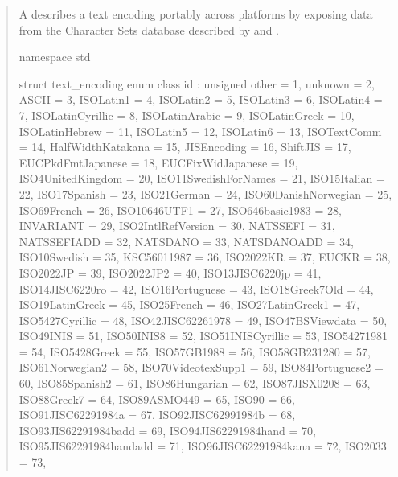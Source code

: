 \documentclass{wg21}
\begin{document}
\begin{quote}
\begin{addedblock}

A  describes a text encoding portably across platforms by exposing data from the Character Sets database described by \cite{rfc2978} and \cite{rfc3808}.

\begin{codeblock}

namespace std {

struct text_encoding{
    enum class id : unsigned {
        other = 1,
        unknown = 2,
        ASCII = 3,
        ISOLatin1 = 4,
        ISOLatin2 = 5,
        ISOLatin3 = 6,
        ISOLatin4 = 7,
        ISOLatinCyrillic = 8,
        ISOLatinArabic = 9,
        ISOLatinGreek = 10,
        ISOLatinHebrew = 11,
        ISOLatin5 = 12,
        ISOLatin6 = 13,
        ISOTextComm = 14,
        HalfWidthKatakana = 15,
        JISEncoding = 16,
        ShiftJIS = 17,
        EUCPkdFmtJapanese = 18,
        EUCFixWidJapanese = 19,
        ISO4UnitedKingdom = 20,
        ISO11SwedishForNames = 21,
        ISO15Italian = 22,
        ISO17Spanish = 23,
        ISO21German = 24,
        ISO60DanishNorwegian = 25,
        ISO69French = 26,
        ISO10646UTF1 = 27,
        ISO646basic1983 = 28,
        INVARIANT = 29,
        ISO2IntlRefVersion = 30,
        NATSSEFI = 31,
        NATSSEFIADD = 32,
        NATSDANO = 33,
        NATSDANOADD = 34,
        ISO10Swedish = 35,
        KSC56011987 = 36,
        ISO2022KR = 37,
        EUCKR = 38,
        ISO2022JP = 39,
        ISO2022JP2 = 40,
        ISO13JISC6220jp = 41,
        ISO14JISC6220ro = 42,
        ISO16Portuguese = 43,
        ISO18Greek7Old = 44,
        ISO19LatinGreek = 45,
        ISO25French = 46,
        ISO27LatinGreek1 = 47,
        ISO5427Cyrillic = 48,
        ISO42JISC62261978 = 49,
        ISO47BSViewdata = 50,
        ISO49INIS = 51,
        ISO50INIS8 = 52,
        ISO51INISCyrillic = 53,
        ISO54271981 = 54,
        ISO5428Greek = 55,
        ISO57GB1988 = 56,
        ISO58GB231280 = 57,
        ISO61Norwegian2 = 58,
        ISO70VideotexSupp1 = 59,
        ISO84Portuguese2 = 60,
        ISO85Spanish2 = 61,
        ISO86Hungarian = 62,
        ISO87JISX0208 = 63,
        ISO88Greek7 = 64,
        ISO89ASMO449 = 65,
        ISO90 = 66,
        ISO91JISC62291984a = 67,
        ISO92JISC62991984b = 68,
        ISO93JIS62291984badd = 69,
        ISO94JIS62291984hand = 70,
        ISO95JIS62291984handadd = 71,
        ISO96JISC62291984kana = 72,
        ISO2033 = 73,
}}}
\end{codeblock}
\end{addedblock}
\end{quote}
\end{document}
